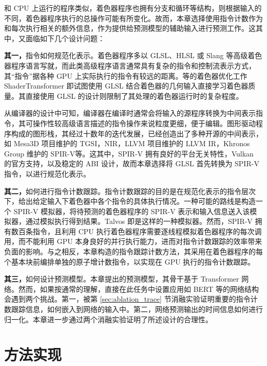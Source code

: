 {\amend 和 CPU 上运行的程序类似，着色器程序也拥有分支和循环等结构，则根据输入的不同，着色器程序执行的总操作可能有所变化。故而，本章选择使用指令计数作为和每次执行相关的额外信息，作为提供给预测模型的辅助输入进行预测工作。这其中，又面临如下几个设计问题：

{\bf 其一，}指令如何规范化表示。着色器程序多以 GLSL、HLSL 或 Slang 等高级着色器程序语言写就，而此类高级程序语言通常具有复杂的指令和控制流表示方式，其“指令”据各种 GPU 上实际执行的指令有较远的距离。\citet{10.1145/3528233.3530722}等的着色器优化工作 ShaderTransformer 即试图使用 GLSL 结合着色器的几何输入直接学习着色器质量。其直接使用 GLSL 的设计则限制了其处理的着色器运行时的复杂程度。

从编译器的设计中可知，编译器在编译时通常会将输入的源程序转换为中间表示指令，其可操作性较高级语言描述的指令操作来说粒度更细，便于编辑。图形驱动程序构成的图形栈，其经过十数年的迭代发展，已经创造出了多种开源的中间表示，如 Mesa3D 项目维护的 TGSI\cite{TGSI}，NIR\cite{NIR}，LLVM 项目维护的 LLVM IR\cite{LLVMIR}，Khronos Group 维护的 SPIR-V\cite{SPIRV}等。这其中，SPIR-V 拥有良好的平台无关特性，Vulkan 的官方支持，以及稳定的 ABI 设计，故而本章选择将 GLSL 首先转换为 SPIR-V 指令，以进行规范化表示。

{\bf 其二，}如何进行指令计数跟踪。指令计数跟踪的目的是在规范化表示的指令层次下，给出给定输入下着色器中各个指令的具体执行情况。一种可能的路线是构造一个 SPIR-V 模拟器，将待预测的着色器程序的 SPIR-V 表示和输入信息送入该模拟器，通过模拟执行得到结果。Talvos \cite{Talvos}即是这样的一种模拟器。然而，SPIR-V 拥有数百条指令，且利用 CPU 执行着色器程序需要逐线程模拟着色器程序的每次调用，而不能利用 GPU 本身良好的并行执行能力，进而对指令计数跟踪的效率带来负面的影响。与之相反，本章构造的指令跟踪计数方法，其采用在着色器程序的每个基本块前编排单独的原子增计数指令，以实现在 GPU 执行的指令计数跟踪。

{\bf 其三，}如何设计预测模型。本章提出的预测模型，其骨干基于 Transformer 网络。然而，如果按通常的理解，直接在此任务中设置应用如 BERT 等的网络结构会遇到两个挑战。第一，被第 \ref{sec:ablation_trace} 节消融实验证明重要的指令计数跟踪信息，如何嵌入到网络的输入中。第二，网络预测输出的时间信息如何进行归一化。本章进一步通过两个消融实验证明了所述设计的合理性。

}

\section{{\amend 方法实现}}

